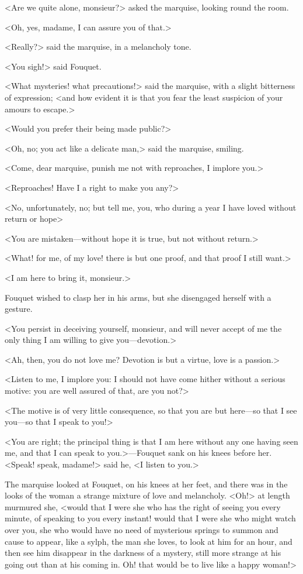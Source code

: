 <Are we quite alone, monsieur?> asked the marquise, looking round the room.

<Oh, yes, madame, I can assure you of that.>

<Really?> said the marquise, in a melancholy tone.

<You sigh!> said Fouquet.

<What mysteries! what precautions!> said the marquise, with a slight bitterness of expression; <and how evident it is that you fear the least suspicion of your amours to escape.>

<Would you prefer their being made public?>

<Oh, no; you act like a delicate man,> said the marquise, smiling.

<Come, dear marquise, punish me not with reproaches, I implore you.>

<Reproaches! Have I a right to make you any?>

<No, unfortunately, no; but tell me, you, who during a year I have loved without return or hope\longdash>

<You are mistaken—without hope it is true, but not without return.>

<What! for me, of my love! there is but one proof, and that proof I still want.>

<I am here to bring it, monsieur.>

Fouquet wished to clasp her in his arms, but she disengaged herself with a gesture.

<You persist in deceiving yourself, monsieur, and will never accept of me the only thing I am willing to give you—devotion.>

<Ah, then, you do not love me? Devotion is but a virtue, love is a passion.>

<Listen to me, I implore you: I should not have come hither without a serious motive: you are well assured of that, are you not?>

<The motive is of very little consequence, so that you are but here—so that I see you—so that I speak to you!>

<You are right; the principal thing is that I am here without any one having seen me, and that I can speak to you.>—Fouquet sank on his knees before her. <Speak! speak, madame!> said he, <I listen to you.>

The marquise looked at Fouquet, on his knees at her feet, and there was in the looks of the woman a strange mixture of love and melancholy. <Oh!> at length murmured she, <would that I were she who has the right of seeing you every minute, of speaking to you every instant! would that I were she who might watch over you, she who would have no need of mysterious springs to summon and cause to appear, like a sylph, the man she loves, to look at him for an hour, and then see him disappear in the darkness of a mystery, still more strange at his going out than at his coming in. Oh! that would be to live like a happy woman!>

